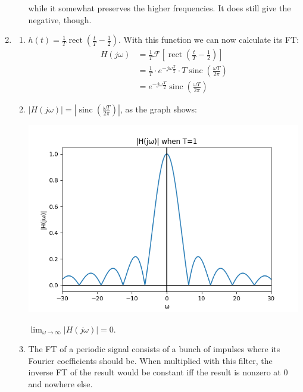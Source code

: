 \documentclass[12pt]{article}
\newcommand{\rect}{\operatorname{rect}}
\newcommand{\sinc}{\operatorname{sinc}}
\newcommand{\ft}[1]{\mathcal{F}\left[#1\right]}
\begin{document}
\begin{enumerate}
\begin{enumerate}
                        while it somewhat preserves the higher frequencies.
                        It does still give the negative, though.
            \end{enumerate}
      \item \begin{enumerate}
                  \item $h(t)=\frac{1}{T}\rect\left(\frac{t}{T}-\frac{1}{2}\right)$.
                        With this function we can now calculate its FT:
                        \begin{align*}
                              H(j\omega)
                               & = \frac{1}{T}\ft{\rect\left(\frac{t}{T}-\frac{1}{2}\right)}                                \\
                               & = \frac{1}{T} \cdot e^{-j\omega\frac{T}{2}} \cdot T\sinc\left(\frac{\omega T}{2\pi}\right) \\
                               & = \boxed{e^{-j\omega\frac{T}{2}}\sinc\left(\frac{\omega T}{2\pi}\right)}
                        \end{align*}
                  \item $|H(j\omega)|=\left|\sinc\left(\frac{\omega T}{2\pi}\right)\right|$, as the graph shows:

                        \includegraphics[width=12cm]{img/hw6/mag_plot}

                        $\lim_{\omega \to \infty} |H(j\omega)| = \boxed{0}$.
                  \item The FT of a periodic signal consists of a bunch of impulses
                        where its Fourier coefficients should be.
                        When multiplied with this filter, the inverse FT of the result
                        would be constant iff the result is nonzero at $0$ and nowhere else.


\end{enumerate}
\end{enumerate}
\end{document}
